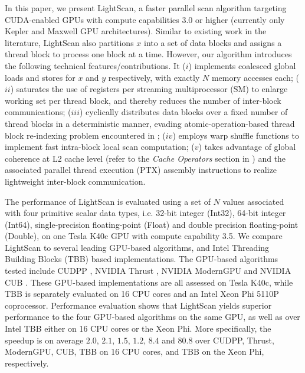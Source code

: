 \documentclass[article]{elsarticle}
\begin{document}
{In this paper, we present LightScan, a faster parallel scan algorithm targeting CUDA-enabled GPUs with compute capabilities 3.0 or higher (currently only Kepler \cite{kepler} and Maxwell \cite{maxwell} GPU architectures). Similar to existing work in the literature, LightScan also partitions $x$ into a set of data blocks and assigns a thread block to process one block at a time. However, our algorithm introduces the following technical features/contributions. It ($i$) implements coalesced global loads and stores for $x$ and $y$ respectively, with exactly $N$ memory accesses each; ($ii$) saturates the use of registers per streaming multiprocessor (SM) to enlarge working set per thread block, and thereby reduces the number of inter-block communications; ($iii$) cyclically distributes data blocks over a fixed number of thread blocks in a deterministic manner, evading atomic-operation-based thread block re-indexing problem encountered in \cite{yan2013streamscan}; ($iv$) employs warp shuffle functions to implement fast intra-block local scan computation; ($v$) takes advantage of global coherence at L2 cache level (refer to the \textit{Cache Operators} section in \cite{ptxisa43}) and the associated parallel thread execution (PTX) assembly instructions to realize lightweight inter-block communication.

The performance of LightScan is evaluated using a set of $N$ values associated with four primitive scalar data types, i.e. 32-bit integer (Int32), 64-bit integer (Int64), single-precision floating-point (Float) and double precision floating-point (Double), on one Tesla K40c GPU with compute capability 3.5. We compare LightScan to several leading GPU-based algorithms, and Intel Threading Building Blocks (TBB) \cite{tbb} based implementations. The GPU-based algorithms tested include CUDPP \cite{harris2007parallel}, NVIDIA Thrust \cite{thrust}, NVIDIA ModernGPU \cite{moderngpu} and NVIDIA CUB \cite{cub}. These GPU-based implementations are all assessed on Tesla K40c, while TBB is separately evaluated on 16 CPU cores and an Intel Xeon Phi 5110P coprocessor. Performance evaluation shows that LightScan yields superior performance to the four GPU-based algorithms on the same GPU, as well as over Intel TBB either on 16 CPU cores or the Xeon Phi. More specifically, the speedup is on average $2.0$, $2.1$, $1.5$, $1.2$, $8.4$ and $80.8$ over CUDPP, Thrust, ModernGPU, CUB, TBB on 16 CPU cores, and TBB on the Xeon Phi, respectively.
}
\end{document}
